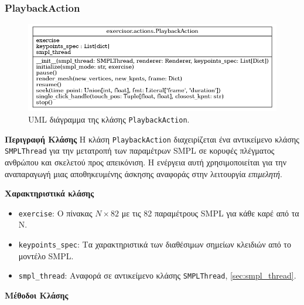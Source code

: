 \subsubsection{PlaybackAction}

\begin{figure}[H]
	\centering
	\includegraphics[scale=0.5]{images/chapter5/playback_action_uml.png}
	\caption{UML διάγραμμα της κλάσης \texttt{PlaybackAction}.}
	\label{fig:playback_action}
\end{figure}

\noindent\textbf{Περιγραφή Κλάσης}
Η κλάση \texttt{PlaybackAction} διαχειρίζεται ένα αντικείμενο κλάσης \texttt{SMPLThread} για την μετατροπή των παραμέτρων SMPL σε κορυφές πλέγματος ανθρώπου και σκελετού προς απεικόνιση. Η ενέργεια αυτή χρησιμοποιείται για την αναπαραγωγή μιας αποθηκευμένης άσκησης αναφοράς στην λειτουργία \textsl{επιμελητή}.

\noindent\textbf{Χαρακτηριστικά κλάσης}
\begin{itemize}
	\item \texttt{exercise}: O πίνακας $Ν \times 82$ με τις 82 παραμέτρους SMPL για κάθε καρέ από τα N.
	\item \texttt{keypoints\_spec}: Τα χαρακτηριστικά των διαθέσιμων σημείων κλειδιών από το μοντέλο SMPL.
	\item \texttt{smpl\_thread}: Αναφορά σε αντικείμενο κλάσης \texttt{SMPLThread}, \ref{sec:smpl_thread}.
\end{itemize}

\noindent\textbf{Μέθοδοι Κλάσης}

